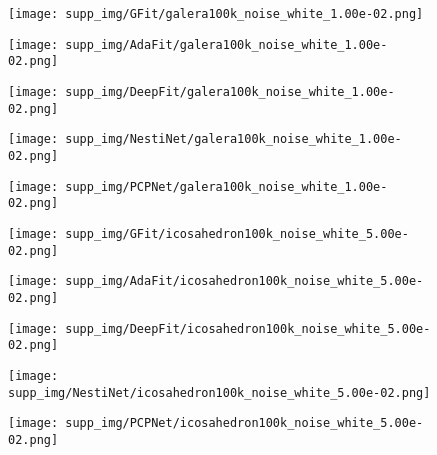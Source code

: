 \documentclass[runningheads]{llncs}
\begin{document}
\begin{figure*}
\begin{subfigure}{0.15\linewidth}
		\centering
		\texttt{[image: supp\_img/GFit/galera100k\_noise\_white\_1.00e-02.png]}
\end{subfigure}
	\hspace{0.1cm}
	\begin{subfigure}{0.15\linewidth}
		\centering
		\texttt{[image: supp\_img/AdaFit/galera100k\_noise\_white\_1.00e-02.png]}
\end{subfigure}
	\hspace{0.1cm}
	\begin{subfigure}{0.17\linewidth}
		\centering
		\texttt{[image: supp\_img/DeepFit/galera100k\_noise\_white\_1.00e-02.png]}
\end{subfigure}
	\hspace{0.1cm}
	\begin{subfigure}{0.17\linewidth}
		\centering
		\texttt{[image: supp\_img/NestiNet/galera100k\_noise\_white\_1.00e-02.png]}
\end{subfigure}
	\hspace{0.1cm}
	\begin{subfigure}{0.17\linewidth}
		\centering
		\texttt{[image: supp\_img/PCPNet/galera100k\_noise\_white\_1.00e-02.png]}
\end{subfigure}
	
\begin{subfigure}{0.15\linewidth}
		\centering
		\texttt{[image: supp\_img/GFit/icosahedron100k\_noise\_white\_5.00e-02.png]}
\end{subfigure}
	\hspace{0.1cm}
	\begin{subfigure}{0.15\linewidth}
		\centering
		\texttt{[image: supp\_img/AdaFit/icosahedron100k\_noise\_white\_5.00e-02.png]}
\end{subfigure}
	\hspace{0.1cm}
	\begin{subfigure}{0.17\linewidth}
		\centering
		\texttt{[image: supp\_img/DeepFit/icosahedron100k\_noise\_white\_5.00e-02.png]}
\end{subfigure}
	\hspace{0.1cm}
	\begin{subfigure}{0.17\linewidth}
		\centering
		\texttt{[image: supp\_img/NestiNet/icosahedron100k\_noise\_white\_5.00e-02.png]}
\end{subfigure}
	\hspace{0.1cm}
	\begin{subfigure}{0.17\linewidth}
		\centering
		\texttt{[image: supp\_img/PCPNet/icosahedron100k\_noise\_white\_5.00e-02.png]}
\end{subfigure}
	

\end{figure*}
\end{document}
